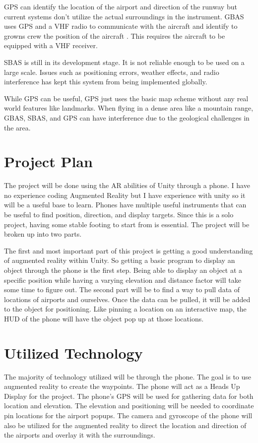 \documentclass[journal]{vgtc}                %
\begin{document}
GPS can identify the location of the airport and direction of the runway but current systems don’t utilize the actual surroundings in the instrument. GBAS uses GPS and a VHF radio to communicate with the aircraft and identify to growns crew the position of the aircraft \cite{murfin_2011, 4106292, 4745647, 4745660}. This requires the aircraft to be equipped with a VHF receiver. 

SBAS is still in its development stage. It is not reliable enough to be used on a large scale. Issues such as positioning errors, weather effects, and radio interference has kept this system from being implemented globally\cite{6184264}.

While GPS can be useful, GPS just uses the basic map scheme without any real world features like landmarks. When flying in a dense area like a mountain range, GBAS, SBAS, and GPS can have interference due to the geological challenges in the area.

\section{Project Plan}

The project will be done using the AR abilities of Unity through a phone. I have no experience coding Augmented Reality but I have experience with unity so it will be a useful base to learn. Phones have multiple useful instruments that can be useful to find position, direction, and display targets. Since this is a solo project, having some stable footing to start from is essential. The project will be broken up into two parts.

	The first and most important part of this project is getting a good understanding of augmented reality within Unity. So getting a basic program to display an object through the phone is the first step. Being able to display an object at a specific position while having a varying elevation and distance factor will take some time to figure out. 
	The second part will be to find a way to pull data of locations of airports and ourselves. Once the data can be pulled, it will be added to the object for positioning. Like pinning a location on an interactive map, the HUD of the phone will have the object pop up at those locations. 


\section{Utilized Technology}

The majority of technology utilized will be through the phone. The goal is to use augmented reality to create the waypoints. The phone will act as a Heads Up Display for the project. The phone’s GPS will be used for gathering data for both location and elevation. The elevation and positioning will be needed to coordinate pin locations for the airport popups. The camera and gyroscope of the phone will also be utilized for the augmented reality to direct the location and direction of the airports and overlay it with the surroundings.
\end{document}

